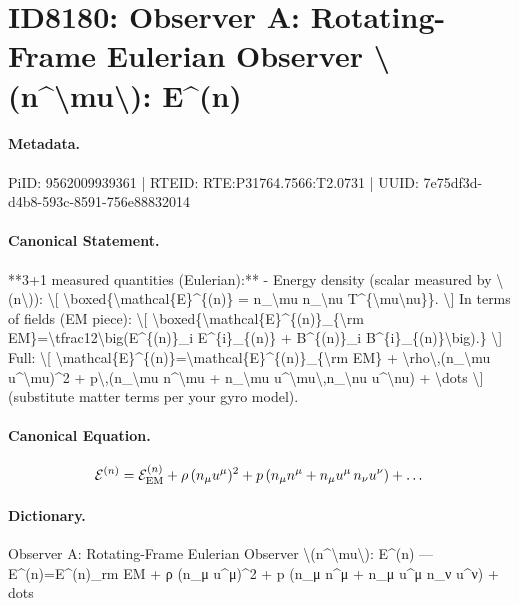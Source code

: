 \section*{ID8180: Observer A: Rotating-Frame Eulerian Observer \textbackslash{}(n\textasciicircum{}\textbackslash{}mu\textbackslash{}): E\textasciicircum{}(n)}
\paragraph{Metadata.}
PiID: 9562009939361 | RTEID: RTE:P31764.7566:T2.0731 | UUID: 7e75df3d-d4b8-593c-8591-756e88832014

\paragraph{Canonical Statement.}
**3+1 measured quantities (Eulerian):** - Energy density (scalar measured by \textbackslash{}(n\textbackslash{})): \textbackslash{}[ \textbackslash{}boxed\{\textbackslash{}mathcal\{E\}\textasciicircum{}\{(n)\} = n\_\textbackslash{}mu n\_\textbackslash{}nu T\textasciicircum{}\{\textbackslash{}mu\textbackslash{}nu\}\}. \textbackslash{}] In terms of fields (EM piece): \textbackslash{}[ \textbackslash{}boxed\{\textbackslash{}mathcal\{E\}\textasciicircum{}\{(n)\}\_\{\textbackslash{}rm EM\}=\textbackslash{}tfrac12\textbackslash{}big(E\textasciicircum{}\{(n)\}\_i E\textasciicircum{}\{i\}\_\{(n)\} + B\textasciicircum{}\{(n)\}\_i B\textasciicircum{}\{i\}\_\{(n)\}\textbackslash{}big).\} \textbackslash{}] Full: \textbackslash{}[ \textbackslash{}mathcal\{E\}\textasciicircum{}\{(n)\}=\textbackslash{}mathcal\{E\}\textasciicircum{}\{(n)\}\_\{\textbackslash{}rm EM\} + \textbackslash{}rho\textbackslash{},(n\_\textbackslash{}mu u\textasciicircum{}\textbackslash{}mu)\textasciicircum{}2 + p\textbackslash{},(n\_\textbackslash{}mu n\textasciicircum{}\textbackslash{}mu + n\_\textbackslash{}mu u\textasciicircum{}\textbackslash{}mu\textbackslash{},n\_\textbackslash{}nu u\textasciicircum{}\textbackslash{}nu) + \textbackslash{}dots \textbackslash{}] (substitute matter terms per your gyro model).

\paragraph{Canonical Equation.}
\[
\mathcal{E}^{(n)}=\mathcal{E}^{(n)}_{\rm EM} + \rho\,(n_\mu u^\mu)^2 + p\,(n_\mu n^\mu + n_\mu u^\mu\,n_\nu u^\nu) + \dots
\]

\paragraph{Dictionary.}
Observer A: Rotating-Frame Eulerian Observer \textbackslash{}(n\textasciicircum{}\textbackslash{}mu\textbackslash{}): E\textasciicircum{}(n) — E\textasciicircum{}(n)=E\textasciicircum{}(n)\_rm EM + ρ (n\_μ u\textasciicircum{}μ)\textasciicircum{}2 + p (n\_μ n\textasciicircum{}μ + n\_μ u\textasciicircum{}μ n\_ν u\textasciicircum{}ν) + dots

